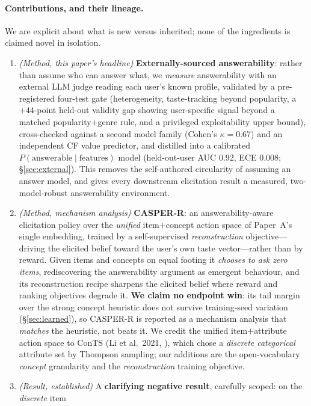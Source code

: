 \documentclass[11pt]{article}
\begin{document}
\paragraph{Contributions, and their lineage.} We are explicit about what is new versus inherited; none of the
ingredients is claimed novel in isolation.
\begin{enumerate}
  \item \emph{(Method, this paper's headline)} \textbf{Externally-sourced answerability}: rather than assume who can
  answer what, we \emph{measure} answerability with an external LLM judge reading each user's known profile, validated by
  a pre-registered four-test gate (heterogeneity, taste-tracking beyond popularity, a $+44$-point held-out validity gap
  showing user-specific signal beyond a matched popularity$+$genre rule, and a privileged exploitability upper bound),
  cross-checked against a second model family (Cohen's $\kappa{=}0.67$) and an independent CF value predictor, and
  distilled into a calibrated $P(\text{answerable}\mid\text{features})$ model (held-out-user AUC $0.92$, ECE $0.008$;
  \S\ref{sec:external}). This removes the self-authored circularity of assuming an answer model, and gives every
  downstream elicitation result a measured, two-model-robust answerability environment.
  \item \emph{(Method, mechanism analysis)} \textbf{CASPER-R}: an answerability-aware elicitation policy over the
  \emph{unified} item$+$concept action space of Paper~A's single embedding, trained by a self-supervised
  \emph{reconstruction} objective---driving the elicited belief toward the user's own taste vector---rather than by
  reward. Given items and concepts on equal footing it \emph{chooses to ask zero items}, rediscovering the answerability
  argument as emergent behaviour, and its reconstruction recipe sharpens the elicited belief where reward and ranking
  objectives degrade it. \textbf{We claim no endpoint win}: its tail margin over the strong concept heuristic does not
  survive training-seed variation (\S\ref{sec:learned}), so CASPER-R is reported as a mechanism analysis that
  \emph{matches} the heuristic, not beats it. We credit the unified item$+$attribute action space to ConTS (Li et al.\
  2021, \cite{conts}), which chose a \emph{discrete categorical} attribute set by Thompson sampling; our additions are the
  open-vocabulary \emph{concept} granularity and the \emph{reconstruction} training objective.
  \item \emph{(Result, established)} A \textbf{clarifying negative result}, carefully scoped: on the \emph{discrete} item

\end{enumerate}
\end{document}

